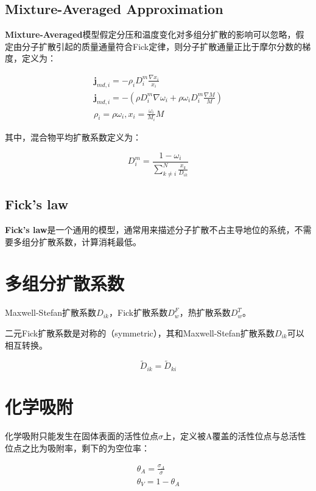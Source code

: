 \subsection{Mixture-Averaged Approximation}
\textbf{Mixture-Averaged}模型假定分压和温度变化对多组分扩散的影响可以忽略，假定由分子扩散引起的质量通量符合Fick定律，则分子扩散通量正比于摩尔分数的梯度，定义为：

\begin{gather}
    \bm{j}_{md,i} = -\rho_i D_i^m \frac{\nabla x_i}{x_i} \\
    \bm{j}_{md,i} = -\left( \rho D_i^m \nabla \omega_i + \rho \omega_i D_i^m \frac{\nabla M}{M} \right) \\
    \rho_i = \rho\omega_i, x_i = \frac{\omega_i}{M_i} M
\end{gather}

其中，混合物平均扩散系数定义为：

\begin{equation}
    D_i^m = \frac{1-\omega_i}{\sum_{k\neq i}^N \frac{x_k}{D_{ik}}}
\end{equation}

\subsection{Fick's law}
\textbf{Fick's law}是一个通用的模型，通常用来描述分子扩散不占主导地位的系统，不需要多组分扩散系数，计算消耗最低。

\section{多组分扩散系数}
Maxwell-Stefan扩散系数$ D_{ik} $，Fick扩散系数$ D_w^F $，热扩散系数$ D_w^T $。

二元Fick扩散系数是对称的（symmetric），其和Maxwell-Stefan扩散系数$D_{ik}$可以相互转换。

\begin{equation}
    \tilde{D}_{ik} = \tilde{D}_{ki}
\end{equation}

\section{化学吸附}
化学吸附只能发生在固体表面的活性位点$ \sigma $上，定义被A覆盖的活性位点与总活性位点之比为吸附率，剩下的为空位率：

\begin{gather}
    \theta_A = \frac{\sigma_A}{\sigma} \\
    \theta_V = 1-\theta_A
\end{gather}

